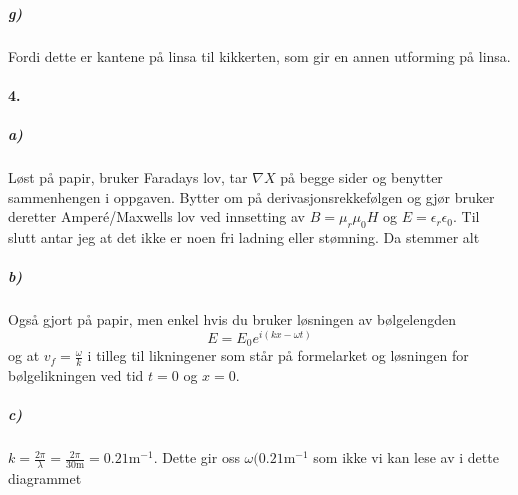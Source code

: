 \documentclass[11pt, A4paper,norsk]{article}
\begin{document}
			\subparagraph{g)}
				\begin{flushleft}
Fordi dette er kantene på linsa til kikkerten, som gir en annen utforming på linsa.
				\end{flushleft}








		\paragraph{4.}
			\subparagraph{a)}
				\begin{flushleft}
Løst på papir, bruker Faradays lov, tar $\nabla X$ på begge sider og benytter sammenhengen i oppgaven. Bytter om på derivasjonsrekkefølgen og gjør bruker deretter Amperé/Maxwells lov ved innsetting av $B = \mu_r \mu_0 H$ og $E = \epsilon_r \epsilon_0$. Til slutt antar jeg at det ikke er noen fri ladning eller stømning. Da stemmer alt
				\end{flushleft}









			\subparagraph{b)}
				\begin{flushleft}
Også gjort på papir, men enkel hvis du bruker løsningen av bølgelengden
$$E = E_0 e^{i (kx - \omega t)}$$
og at $v_f = \frac{\omega}{k}$ i tilleg til likningener som står på formelarket og løsningen for bølgelikningen ved tid $t = 0$ og $x = 0$.
				\end{flushleft}









			\subparagraph{c)}
				\begin{flushleft}
$k = \frac{2 \pi}{\lambda} = \frac{2 \pi}{30 \text{m}} = 0.21 \text{m}^{-1}$. Dette gir oss $\omega(0.21 \text{m}^{-1}$ som ikke vi kan lese av i dette diagrammet
				\end{flushleft}
\end{document}

